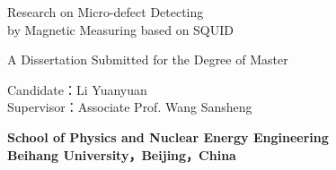 \documentclass[a4paper,12pt，twoside]{ctexart}
\begin{document}
	\newpage%
	\begin{titlepage}
		
	
	\begin{center}
		\vspace*{3cm}
		{\fontsize{18pt}{22pt}\selectfont Research on Micro-defect Detecting\\ 
			by Magnetic Measuring based on SQUID}
		
		\vspace{4cm}
		
		{\fontsize{12pt}{14pt}\selectfont A Dissertation Submitted for the Degree of Master}
		
		\vspace{4cm}
		
		{\fontsize{15pt}{18pt}\selectfont Candidate：Li Yuanyuan \\
			
			Supervisor：Associate Prof. Wang Sansheng}
		
		\vspace{4cm}
		
		{\fontsize{15pt}{18pt}\selectfont \textbf{School of Physics and Nuclear Energy Engineering\\  
				Beihang University，Beijing，China}}
		
	\end{center}
	
	\end{titlepage}
	
	\newpage
	
\end{document}
